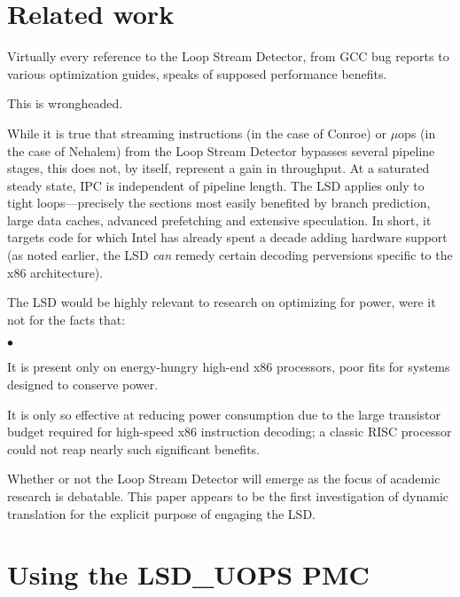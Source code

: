 \documentclass[]{sigplanconf}
\newcommand{\squishlist}{\begin{list}{$\bullet$}
  {\setlength{\itemsep}{0pt}
    \setlength{\parsep}{3pt}
    \setlength{\topsep}{3pt}
    \setlength{\partopsep}{0pt}
    \setlength{\leftmargin}{1.5em}
    \setlength{\labelwidth}{1em}
    \setlength{\labelsep}{0.5em}}}
\newcommand{\squishend}{\end{list}}
\begin{document}
\section{Related work}
Virtually every reference to the Loop Stream Detector, from GCC bug reports
\cite{gcclsd} to various optimization guides, speaks of supposed performance benefits.

This is wrongheaded.

While it is true that streaming instructions (in the case of Conroe) or $\mu$ops
(in the case of Nehalem) from the Loop Stream Detector bypasses several pipeline stages,
this does not, by itself, represent a gain in throughput. At a saturated steady
state, IPC is independent of pipeline length. The LSD applies only to tight
loops---precisely the sections most easily benefited by branch prediction,
large data caches, advanced prefetching and extensive speculation. In short,
it targets code for which Intel has already spent a decade adding hardware
support (as noted earlier, the LSD \textit{can} remedy certain decoding
perversions specific to the x86 architecture).

The LSD would be highly relevant to research on optimizing for power, were it
not for the facts that:
\squishlist
\item It is present only on energy-hungry high-end x86 processors, poor fits for
systems designed to conserve power.
\item It is only so effective at reducing power consumption due to the large
transistor budget required for high-speed x86 instruction decoding; a classic
RISC processor could not reap nearly such significant benefits.
\squishend
Whether or not the Loop Stream Detector will emerge as the focus of academic
research is debatable. This paper appears to be the first investigation
of dynamic translation for the explicit purpose of engaging the LSD.
\appendix
\section{Using the LSD\_UOPS PMC}



\end{document}
